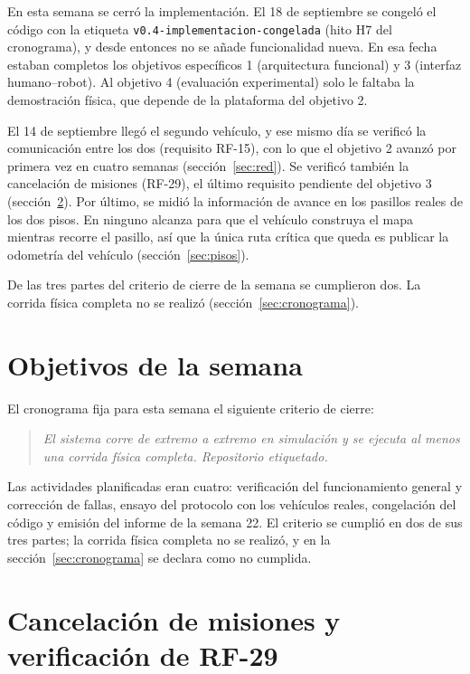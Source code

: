 \documentclass[12pt,letterpaper]{article}
\begin{document}
En esta semana se cerró la implementación. El 18 de septiembre se congeló el código con la etiqueta \texttt{v0.4-implementacion-congelada} (hito H7 del cronograma), y desde entonces no se añade funcionalidad nueva. En esa fecha estaban completos los objetivos específicos 1 (arquitectura funcional) y 3 (interfaz humano--robot). Al objetivo 4 (evaluación experimental) solo le faltaba la demostración física, que depende de la plataforma del objetivo 2.

El 14 de septiembre llegó el segundo vehículo, y ese mismo día se verificó la comunicación entre los dos (requisito RF-15), con lo que el objetivo 2 avanzó por primera vez en cuatro semanas (sección~\ref{sec:red}). Se verificó también la cancelación de misiones (RF-29), el último requisito pendiente del objetivo 3 (sección~\ref{sec:rf29}). Por último, se midió la información de avance en los pasillos reales de los dos pisos. En ninguno alcanza para que el vehículo construya el mapa mientras recorre el pasillo, así que la única ruta crítica que queda es publicar la odometría del vehículo (sección~\ref{sec:pisos}).

De las tres partes del criterio de cierre de la semana se cumplieron dos. La corrida física completa no se realizó (sección~\ref{sec:cronograma}).

\section{Objetivos de la semana}

El cronograma fija para esta semana el siguiente criterio de cierre:

\begin{quote}
\textit{El sistema corre de extremo a extremo en simulación y se ejecuta al menos una corrida física completa. Repositorio etiquetado.}
\end{quote}

Las actividades planificadas eran cuatro: verificación del funcionamiento general y corrección de fallas, ensayo del protocolo con los vehículos reales, congelación del código y emisión del informe de la semana 22. El criterio se cumplió en dos de sus tres partes; la corrida física completa no se realizó, y en la sección~\ref{sec:cronograma} se declara como no cumplida.

\section{Cancelación de misiones y verificación de RF-29}
\label{sec:rf29}
\end{document}
